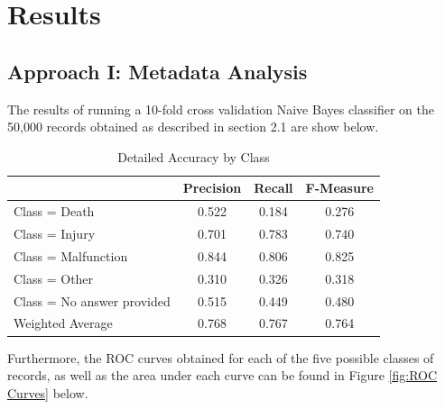 \documentclass[11pt, notitlepage,abstracton,oneside]{article}   	%
\begin{document}
\section{Results}

\subsection{Approach I: Metadata Analysis}
The results of running a 10-fold cross validation Naive Bayes classifier on the 50,000 records obtained as described in section 2.1 are show below.

\begin{table}[htdp]
\caption{Detailed Accuracy by Class}
\begin{center}
\begin{tabular}{|l|c|c|c|}
\hline
& Precision & Recall & F-Measure \\ \hline
Class = Death & 0.522 & 0.184 & 0.276 \\ \hline
Class = Injury & 0.701 & 0.783 & 0.740 \\ \hline
Class = Malfunction & 0.844 & 0.806 & 0.825 \\ \hline
Class = Other & 0.310 & 0.326 & 0.318 \\ \hline
Class = No answer provided & 0.515 & 0.449 & 0.480 \\ \hline
Weighted Average & 0.768 & 0.767 & 0.764 \\ \hline
\end{tabular}
\end{center}
\label{default}
\end{table}

Furthermore, the ROC curves obtained for each of the five possible classes of records, as well as the area under each curve can be found in Figure \ref{fig:ROC Curves} below.
\end{document}
